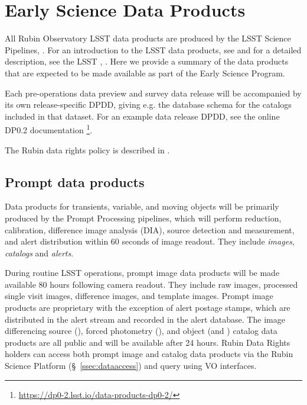 \section{Early Science Data Products}
\label{sec:data}

All Rubin Observatory LSST data products are produced by the LSST Science Pipelines, \cite{2019ASPC..523..521B,2018PASJ...70S...5B}. 
For an introduction to the LSST data products, see \citet{RubinDataProductsAbridged} and for a detailed description, see the LSST \dpdd,  \citet{LSE-163}.
Here we provide a summary of the data products that are expected to be made available as part of the Early Science Program.

Each pre-operations data preview and survey data release will be accompanied by its own release-specific DPDD, giving e.g. the  database schema for the catalogs included in that dataset.
For an example data release DPDD, see the online DP0.2 documentation \footnote{\url{https://dp0-2.lsst.io/data-products-dp0-2/}}.

The Rubin data rights policy is described in  \cite{RDO-013}.

\subsection{Prompt data products}

Data products for transients, variable, and moving objects will be primarily produced by the Prompt Processing pipelines, which will perform reduction, calibration, difference image analysis (DIA), source detection and measurement, and alert distribution within 60 seconds of image readout. 
They include \emph{images}, \emph{catalogs} and \emph{alerts}. 

During routine LSST operations, prompt image data products will be made available 80 hours following camera readout. 
They include raw images, processed single visit images, difference images, and template images. 
Prompt image products are proprietary with the exception of  alert postage stamps, which are distributed in the alert stream and recorded in the alert database.
The image differencing source (\DIASource), forced photometry (\DIAForcedSource), and object (\DIAObject and \SSObject)
catalog data products are all public and will be available after 24 hours. 
Rubin Data Rights holders can access both prompt image and catalog data products via the Rubin Science Platform (\S~\ref{ssec:dataaccess}) and query using VO interfaces. 

